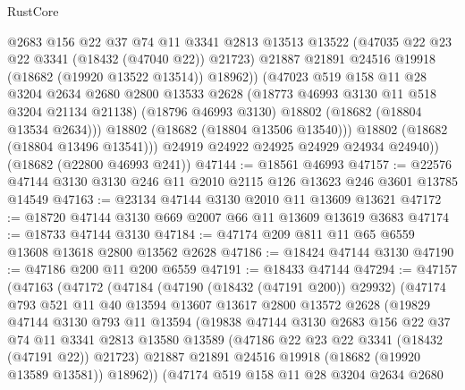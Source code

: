\begin{lexlean}{RustCore}
\begin{coremodule}
                @2683
                @156
                @22
                @37
                @74
                @11
                @3341
                @2813
                @13513
                @13522
                (@47035 @22 @23 @22 @3341 (@18432 (@47040 @22)) @21723)
                @21887
                @21891
                @24516
                @19918
                (@18682 (@19920 @13522 @13514))
                @18962))
            (@47023
              @519
              @158
              @11
              @28
              @3204
              @2634
              @2680
              @2800
              @13533
              @2628
              (@18773 @46993 @3130 @11 @518 @3204 @21134 @21138)
              (@18796 @46993 @3130)
              @18802
              (@18682 (@18804 @13534 @2634)))
            @18802
            (@18682 (@18804 @13506 @13540)))
          @18802
          (@18682 (@18804 @13496 @13541)))
        @24919
        @24922
        @24925
        @24929
        @24934
        @24940))
    (@18682 (@22800 @46993 @241))
@47144 := @18561 @46993
@47157 := @22576 @47144 @3130 @3130 @246 @11 @2010 @2115 @126 @13623 @246 @3601 @13785 @14549
@47163 := @23134 @47144 @3130 @2010 @11 @13609 @13621
@47172 := @18720 @47144 @3130 @669 @2007 @66 @11 @13609 @13619 @3683
@47174 := @18733 @47144 @3130
@47184 := @47174 @209 @811 @11 @65 @6559 @13608 @13618 @2800 @13562 @2628
@47186 := @18424 @47144 @3130
@47190 := @47186 @200 @11 @200 @6559
@47191 := @18433 @47144
@47294 := @47157
    (@47163
      (@47172
        (@47184
          (@47190 (@18432 (@47191 @200)) @29932)
          (@47174
            @793
            @521
            @11
            @40
            @13594
            @13607
            @13617
            @2800
            @13572
            @2628
            (@19829
              @47144
              @3130
              @793
              @11
              @13594
              (@19838
                @47144
                @3130
                @2683
                @156
                @22
                @37
                @74
                @11
                @3341
                @2813
                @13580
                @13589
                (@47186 @22 @23 @22 @3341 (@18432 (@47191 @22)) @21723)
                @21887
                @21891
                @24516
                @19918
                (@18682 (@19920 @13589 @13581))
                @18962))
            (@47174
              @519
              @158
              @11
              @28
              @3204
              @2634
              @2680

\end{coremodule}
\end{lexlean}
